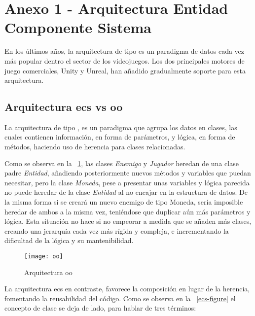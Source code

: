 \chapter*{Anexo 1 - Arquitectura Entidad Componente Sistema}
\label{cap:annex1}

En los últimos años, la arquitectura de tipo  es un paradigma de datos
cada vez más popular dentro el sector de los videojuegos\cite{evolve-ecs}\cite{mmog-ecs}. Los dos principales motores de juego comerciales, Unity\cite{unity}
y Unreal\cite{unreal}, han añadido gradualmente soporte para esta arquitectura\cite{unity-ecs}\cite{unreal-ecs}.
\section*{Arquitectura \gls{ecs} vs \gls{oo}}

La arquitectura de tipo , es un paradigma que agrupa los datos en clases, las cuales contienen
información, en forma de parámetros, y lógica, en forma de métodos, haciendo uso de herencia para clases relacionadas.

Como se observa en la \figurename~\ref{oo-figure}, las clases \textit{Enemigo} y 
\textit{Jugador} heredan de una clase padre \textit{Entidad}, añadiendo posteriormente nuevos métodos y
variables que puedan necesitar, pero la clase \textit{Moneda}, pese a presentar unas variables y lógica parecida 
no puede heredar de la clase \textit{Entidad} al no encajar en la estructura de datos. De la misma forma si se creará
un nuevo enemigo de tipo Moneda, sería imposible heredar de ambos a la misma vez, teniéndose que duplicar aún más
parámetros y lógica. Esta situación no hace si no empeorar a medida que se añaden más clases, creando una jerarquía
cada vez más rígida y compleja, e incrementando la dificultad de la lógica y su mantenibilidad.

\begin{figure}[!h]
	\centering
	\texttt{[image: oo]}
	\caption{Arquitectura \gls{oo}}
	\label{oo-figure}
\end{figure}

\newpage

La arquitectura \gls{ecs} en contraste, favorece la composición en lugar de la herencia, fomentando la reusabilidad del 
código. Como se observa en la \figurename~\ref{ecs-figure} el concepto de clase se deja de lado, para hablar de tres términos:

